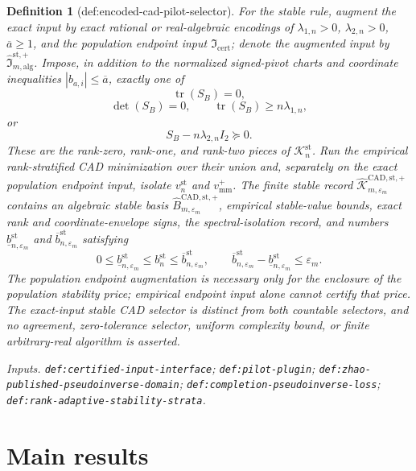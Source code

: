 \documentclass{article}
\newtheorem{definition}{Definition}
\begin{document}
\begin{definition}[def:encoded-cad-pilot-selector]
For the stable rule, augment the exact input by exact rational or real-algebraic encodings of \(\lambda_{1,n}>0\), \(\lambda_{2,n}>0\), \(\overline a\ge1\), and the population endpoint input \(\mathfrak I_{\mathrm{cert}}\); denote the augmented input by \(\widehat{\mathfrak I}_{m,\mathrm{alg}}^{\mathrm{st},+}\).  Impose, in addition to the normalized signed-pivot charts and coordinate inequalities \(|b_{a,i}|\le\overline a\), exactly one of
\[
\operatorname{tr}(S_B)=0,
\]
\[
\det(S_B)=0,\qquad \operatorname{tr}(S_B)\ge n\lambda_{1,n},
\]
or
\[
S_B-n\lambda_{2,n}I_2\succeq0.
\]
These are the rank-zero, rank-one, and rank-two pieces of \(\mathcal K_n^{\mathrm{st}}\).  Run the empirical rank-stratified CAD minimization over their union and, separately on the exact population endpoint input, isolate \(v_n^{\mathrm{st}}\) and \(v_{\mathrm{mm}}^+\).  The finite stable record \(\widehat{\mathscr K}_{m,\varepsilon_m}^{\mathrm{CAD,st},+}\) contains an algebraic stable basis \(\widehat B_{m,\varepsilon_m}^{\mathrm{CAD,st},+}\), empirical stable-value bounds, exact rank and coordinate-envelope signs, the spectral-isolation record, and numbers \(\underline b_{n,\varepsilon_m}^{\mathrm{st}}\) and \(\overline b_{n,\varepsilon_m}^{\mathrm{st}}\) satisfying
\[
0\le\underline b_{n,\varepsilon_m}^{\mathrm{st}}
\le b_n^{\mathrm{st}}
\le\overline b_{n,\varepsilon_m}^{\mathrm{st}},
\qquad
\overline b_{n,\varepsilon_m}^{\mathrm{st}}
-\underline b_{n,\varepsilon_m}^{\mathrm{st}}
\le\varepsilon_m.
\]
The population endpoint augmentation is necessary only for the enclosure of the population stability price; empirical endpoint input alone cannot certify that price.  The exact-input stable CAD selector is distinct from both countable selectors, and no agreement, zero-tolerance selector, uniform complexity bound, or finite arbitrary-real algorithm is asserted.
\par\smallskip\noindent\emph{Inputs.} \texttt{def:\allowbreak{}certified-\allowbreak{}input-\allowbreak{}interface}; \texttt{def:\allowbreak{}pilot-\allowbreak{}plugin}; \texttt{def:\allowbreak{}zhao-\allowbreak{}published-\allowbreak{}pseudoinverse-\allowbreak{}domain}; \texttt{def:\allowbreak{}completion-\allowbreak{}pseudoinverse-\allowbreak{}loss}; \texttt{def:\allowbreak{}rank-\allowbreak{}adaptive-\allowbreak{}stability-\allowbreak{}strata}.
\end{definition}

\section{Main results}
\end{document}
